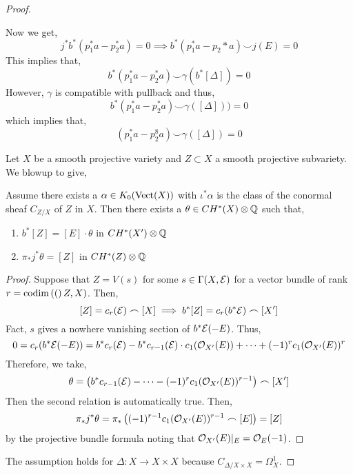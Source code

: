 \documentclass[12pt]{article}
\begin{document}
\begin{proof}
\begin{center}
\end{center}
Now we get,
\[ j^* b^* (p_1^* a- p_2^* a) = 0 \implies b^*(p_1^* a - p_2*a) \smile j(E) = 0 \]
This implies that,
\[ b^* (p_1^* a - p_2^* a) \smile \gamma(b^*[\Delta]) = 0 \]
However, $\gamma$ is compatible with pullback and thus,
\[ b^* (p_1^* a - p_2^* a) \smile \gamma([\Delta])) = 0 \]
which implies that,
\[ (p_1^* a - p_2^8a) \smile \gamma([\Delta]) = 0 \]
\begin{lemma}
Let $X$ be a smooth projective variety and $Z \subset X$ a smooth projective subvariety. We blowup to give,
\begin{center}
\end{center}
Assume there exists a $\alpha \in K_0(\mathrm{Vect}(X))$ with $\iota^* \alpha$ is the class of the conormal sheaf $C_{Z / X}$ of $Z$ in $X$. Then there exists a $\theta \in CH^*(X) \otimes \mathbb{Q}$ such that,
\begin{enumerate}
\item $b^* [Z] = [E] \cdot \theta$ in $CH^*(X') \otimes \mathbb{Q}$
\item $\pi_* j^* \theta = [Z]$ in $CH^*(Z) \otimes \mathbb{Q}$
\end{enumerate}
\end{lemma}


\begin{proof}
Suppose that $Z = V(s)$ for some $s \in \Gamma(X, \mathcal{E})$ for a vector bundle of rank $r = \mathrm{codim}\left( ( \right)Z,X)$. Then,
\[ [Z] = c_r(\mathcal{E}) \frown [X] \implies b^*[Z] = c_r(b^* \mathcal{E}) \frown [X'] \]
Fact, $s$ gives a nowhere vanishing section of $b^* \mathcal{E}(-E)$. Thus,
\[ 0 = c_r(b^* \mathcal{E}(-E)) = b^* c_r(\mathcal{E}) - b^* c_{r-1}(\mathcal{E}) \cdot c_1(\mathcal{O}_{X'}(E)) + \cdots + (-1)^r c_1(\mathcal{O}_{X'}(E))^r \]
Therefore, we take,
\[ \theta = \left( b^* c_{r-1}(\mathcal{E}) - \cdots - (-1)^r c_1(\mathcal{O}_{X'}(E))^{r- 1} \right) \frown [X'] \]
Then the second relation is automatically true. Then,
\[ \pi_* j^* \theta = \pi_* \left( (-1)^{r-1} c_1(\mathcal{O}_{X'}(E))^{r - 1} \frown [E] \right) = [Z] \]
by the projective bundle formula noting that $\mathcal{O}_{X'}(E) |_E   = \mathcal{O}_{E}(-1)$. 
\end{proof}

The assumption holds for $\Delta : X \to X \times X$ because $C_{\Delta / X \times X} = \Omega^1_X$. 

\end{proof}
\end{document}
